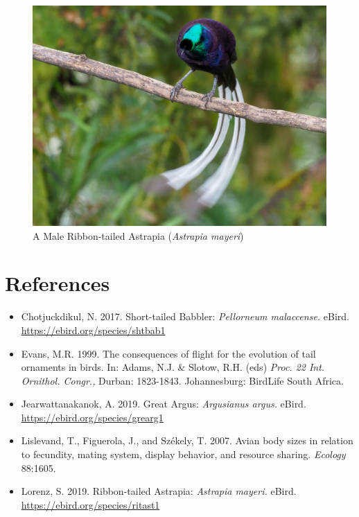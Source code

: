 \documentclass[
  12pt,
]{article}
\begin{document}
\begin{figure}
\centering
\includegraphics{Images/ribbon-tailed_astrapia.jpeg}
\caption{A Male Ribbon-tailed Astrapia (\emph{Astrapia mayeri})}
\end{figure}

\newpage

\hypertarget{references}{%
\section{References}\label{references}}

\begin{itemize}
\item
  Chotjuckdikul, N. 2017. Short-tailed Babbler: \emph{Pellorneum
  malaccense.} eBird. \url{https://ebird.org/species/shtbab1}
\item
  Evans, M.R. 1999. The consequences of flight for the evolution of tail
  ornaments in birds. In: Adams, N.J. \& Slotow, R.H. (eds) \emph{Proc.
  22 Int. Ornithol. Congr.,} Durban: 1823-1843. Johannesburg: BirdLife
  South Africa.
\item
  Jearwattanakanok, A. 2019. Great Argus: \emph{Argusianus argus.}
  eBird. \url{https://ebird.org/species/grearg1}
\item
  Lislevand, T., Figuerola, J., and Székely, T. 2007. Avian body sizes
  in relation to fecundity, mating system, display behavior, and
  resource sharing. \emph{Ecology} 88:1605.
\item
  Lorenz, S. 2019. Ribbon-tailed Astrapia: \emph{Astrapia mayeri.}
  eBird. \url{https://ebird.org/species/ritast1}
\end{itemize}
\end{document}
